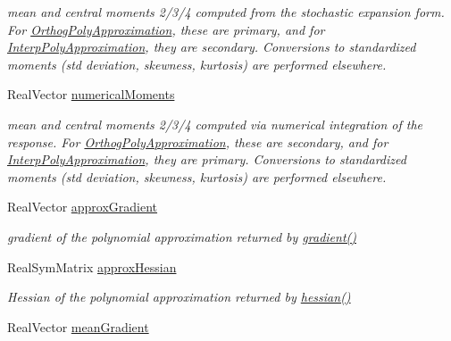 \begin{DoxyCompactItemize}
\begin{DoxyCompactList}\small\item\em mean and central moments 2/3/4 computed from the stochastic expansion form. For \hyperlink{classPecos_1_1OrthogPolyApproximation}{Orthog\+Poly\+Approximation}, these are primary, and for \hyperlink{classPecos_1_1InterpPolyApproximation}{Interp\+Poly\+Approximation}, they are secondary. Conversions to standardized moments (std deviation, skewness, kurtosis) are performed elsewhere. \end{DoxyCompactList}\item 
Real\+Vector \hyperlink{classPecos_1_1PolynomialApproximation_a839faafc67c72fdb46fff643aa3b17e2}{numerical\+Moments}\label{classPecos_1_1PolynomialApproximation_a839faafc67c72fdb46fff643aa3b17e2}

\begin{DoxyCompactList}\small\item\em mean and central moments 2/3/4 computed via numerical integration of the response. For \hyperlink{classPecos_1_1OrthogPolyApproximation}{Orthog\+Poly\+Approximation}, these are secondary, and for \hyperlink{classPecos_1_1InterpPolyApproximation}{Interp\+Poly\+Approximation}, they are primary. Conversions to standardized moments (std deviation, skewness, kurtosis) are performed elsewhere. \end{DoxyCompactList}\item 
Real\+Vector \hyperlink{classPecos_1_1PolynomialApproximation_aa31607477f28dae20016926c8f163347}{approx\+Gradient}\label{classPecos_1_1PolynomialApproximation_aa31607477f28dae20016926c8f163347}

\begin{DoxyCompactList}\small\item\em gradient of the polynomial approximation returned by \hyperlink{classPecos_1_1PolynomialApproximation_a42bf374bf23c32c941ee2acae5ad56a4}{gradient()} \end{DoxyCompactList}\item 
Real\+Sym\+Matrix \hyperlink{classPecos_1_1PolynomialApproximation_a20bd98dd52963ca471a44fecf188ff67}{approx\+Hessian}\label{classPecos_1_1PolynomialApproximation_a20bd98dd52963ca471a44fecf188ff67}

\begin{DoxyCompactList}\small\item\em Hessian of the polynomial approximation returned by \hyperlink{classPecos_1_1PolynomialApproximation_ad0b8d39aa7ec7b96b8753ac84e806d42}{hessian()} \end{DoxyCompactList}\item 
Real\+Vector \hyperlink{classPecos_1_1PolynomialApproximation_a56830fcf2252fb98f479e8e2c113fc54}{mean\+Gradient}\label{classPecos_1_1PolynomialApproximation_a56830fcf2252fb98f479e8e2c113fc54}


\end{DoxyCompactItemize}
